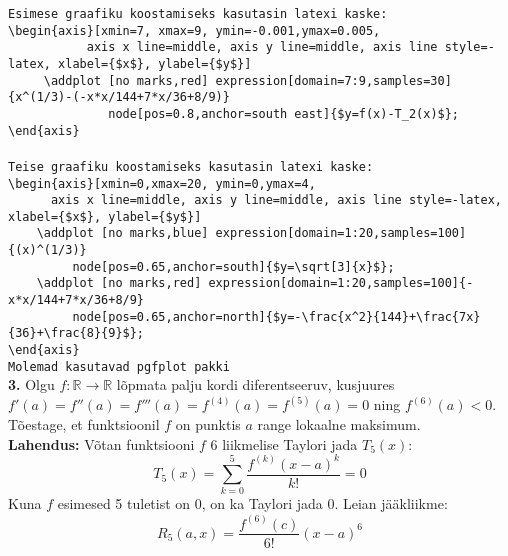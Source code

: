\documentclass{article}
\begin{document}
\scriptsize{\verb!Esimese graafiku koostamiseks kasutasin latexi kaske:!\\
\verb!\begin{axis}[xmin=7, xmax=9, ymin=-0.001,ymax=0.005,!\\
\verb!		     axis x line=middle, axis y line=middle, axis line style=-latex, xlabel={$x$}, ylabel={$y$}]!\\
\verb!	   \addplot [no marks,red] expression[domain=7:9,samples=30]{x^(1/3)-(-x*x/144+7*x/36+8/9)}!\\
\verb!		        node[pos=0.8,anchor=south east]{$y=f(x)-T_2(x)$};!\\
\verb!\end{axis}!\\\\
\verb!Teise graafiku koostamiseks kasutasin latexi kaske:!\\
\verb!\begin{axis}[xmin=0,xmax=20, ymin=0,ymax=4,!\\
\verb!      axis x line=middle, axis y line=middle, axis line style=-latex, xlabel={$x$}, ylabel={$y$}]!\\
\verb!    \addplot [no marks,blue] expression[domain=1:20,samples=100]{(x)^(1/3)}!\\
\verb!         node[pos=0.65,anchor=south]{$y=\sqrt[3]{x}$};!\\
\verb!    \addplot [no marks,red] expression[domain=1:20,samples=100]{-x*x/144+7*x/36+8/9}!\\
\verb!         node[pos=0.65,anchor=north]{$y=-\frac{x^2}{144}+\frac{7x}{36}+\frac{8}{9}$};!\\
\verb!\end{axis}!\\
\verb!Molemad kasutavad pgfplot pakki!}
\pagebreak\\
\textbf{3.} Olgu $f: \mathbb{R}\to\mathbb{R}$ l\~opmata palju kordi diferentseeruv, kusjuures $f'(a)=f''(a)=f'''(a)=f^{(4)}(a)=f^{(5)}(a)=0$ ning $f^{(6)}(a)<0$. T\~oestage, et funktsioonil $f$ on punktis $a$ range lokaalne maksimum.\\
\textbf{Lahendus:} V\~otan funktsiooni $f$ 6 liikmelise Taylori jada $T_5(x)$:\\
\begin{equation*}
T_5(x)=\sum_{k=0}^5\frac{f^{(k)}(x-a)^k}{k!}=0
\end{equation*}
Kuna $f$ esimesed 5 tuletist on 0, on ka Taylori jada 0. Leian j\"a\"akliikme:
\begin{equation*}
R_5(a,x)=\frac{f^{(6)}(c)}{6!}(x-a)^6
\end{equation*}
\end{document}
